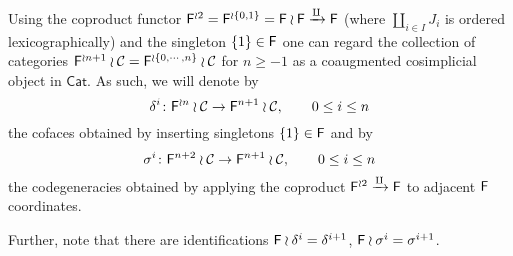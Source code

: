 \documentclass[a4paper,10pt]{article}%
\begin{document}
 
\begin{notation}
      \label{FIN_COA_COS_NOT}
Using the coproduct functor $\mathsf{F}^{\wr 2} = \mathsf{F}^{\wr \{{0,1\}}} =\mathsf{F} \wr \mathsf{F} \xrightarrow{\amalg} \mathsf{F}$ (where $\coprod_{i\in I} J_i$ is ordered lexicographically) and the singleton $\{1\} \in \mathsf{F}$
one can regard the collection of categories 
$\mathsf{F}^{\wr n+1 }\wr \mathcal{C} = \mathsf{F}^{\wr \{0,\cdots,n\}} \wr \mathcal{C} $ for $n \geq -1$
 as a coaugmented cosimplicial object in $\mathsf{Cat}$.
As such, we will denote by
\[
	\delta^i\colon \mathsf{F}^{\wr n } \wr \mathcal{C} \to \mathsf{F}^{n+1} \wr \mathcal{C}, \qquad 0 \leq i \leq n
\]
the cofaces obtained by inserting singletons $\{1\} \in \mathsf{F}$ and by 
\[
	\sigma^i \colon \mathsf{F}^{n+2} \wr \mathcal{C} \to \mathsf{F}^{n+1} \wr \mathcal{C}, \qquad 0 \leq i \leq n
\]
the codegeneracies obtained by applying the coproduct 
$\mathsf{F}^{\wr 2} \xrightarrow{\amalg} \mathsf{F}$ to adjacent 
$\mathsf{F}$ coordinates.

Further, note that there are identifications
$\mathsf{F} \wr \delta^{i} = \delta^{i+1}$, 
$\mathsf{F} \wr \sigma^{i} = \sigma^{i+1}$.
\end{notation}
 
\end{document}
